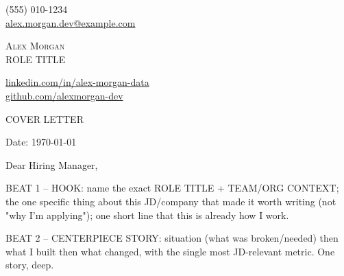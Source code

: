 \documentclass[letterpaper,11pt]{article}
\begin{document}
\begin{center}
    \begin{minipage}[c]{0.32\textwidth}
            \small (555) 010-1234 \\
            \small \href{mailto:alex.morgan.dev@example.com}{alex.morgan.dev@example.com}
    \end{minipage}%
    \begin{minipage}[c]{0.36\textwidth}
            \centering
            {\huge \scshape Alex Morgan} \\
            \vspace{2pt}
            {\color{UI_blue} \large {{ROLE TITLE}}}
    \end{minipage}%
    \begin{minipage}[c]{0.32\textwidth}
            \raggedleft \small
            \href{https://linkedin.com/in/alex-morgan-data}{linkedin.com/in/alex-morgan-data} \\
            \href{https://github.com/alexmorgan-dev}{github.com/alexmorgan-dev}
    \end{minipage}

\vspace{6pt}
{\color{UI_blue} \hrulefill}
\end{center}

\setlength{\parindent}{0pt}
\setlength{\parskip}{12pt}
\vspace{0.2cm}
\begin{center}
    {\color{UI_blue} \Large COVER LETTER}
\end{center}

Date: \today \par \vspace{-0.1cm}
Dear Hiring Manager,

{{BEAT 1 -- HOOK: name the exact ROLE TITLE + TEAM/ORG CONTEXT; the one specific thing about
this JD/company that made it worth writing (not "why I'm applying"); one short line that this is
already how I work.}}

{{BEAT 2 -- CENTERPIECE STORY: situation (what was broken/needed) then what I built then what
changed, with the single most JD-relevant metric. One story, deep.}}
\end{document}
